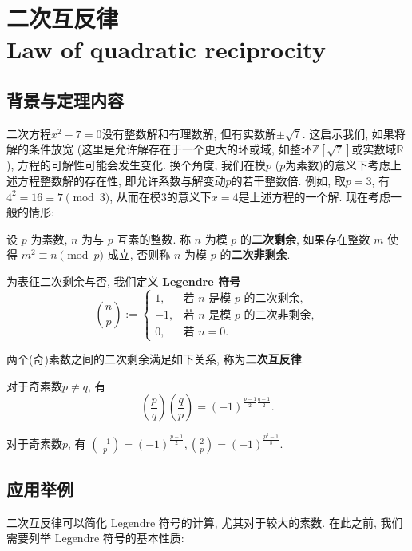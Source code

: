 \documentclass[main]{subfiles}
\newcommand{\mr}{\mathbb{R}}
\newcommand{\mz}{\mathbb{Z}}
\begin{document}
\renewcommand{\filename}{二次互反律}%
\section{二次互反律 \\ Law of quadratic reciprocity}

\subsection{背景与定理内容}

二次方程$x^2-7=0$没有整数解和有理数解, 但有实数解$\pm\sqrt{7}$. 这启示我们, 如果将解的条件放宽 (这里是允许解存在于一个更大的环或域, 如整环$\mz[\sqrt{7}]$或实数域$\mr$), 方程的可解性可能会发生变化. 换个角度, 我们在模$p$ ($p$为素数)的意义下考虑上述方程整数解的存在性, 即允许系数与解变动$p$的若干整数倍. 例如, 取$p=3$, 有$4^2 = 16 \equiv 7 \pmod 3$, 从而在模$3$的意义下$x=4$是上述方程的一个解. 现在考虑一般的情形:

\begin{definition}[二次剩余]
	设 $p$ 为素数, $n$ 为与 $p$ 互素的整数.
	称 $n$ 为模 $p$ 的\textbf{二次剩余},
	如果存在整数 $m$ 使得
	\(
	m^2 \equiv n \pmod p
	\)
	成立, 否则称 $n$ 为模 $p$ 的\textbf{二次非剩余}.
\end{definition}

为表征二次剩余与否, 我们定义 \textbf{Legendre 符号}
\[
	\left( \frac{n}{p} \right) := \left\{\begin{array}{ll}
		1,  & \mbox{若 $n$ 是模 $p$ 的二次剩余},  \\
		-1, & \mbox{若 $n$ 是模 $p$ 的二次非剩余}, \\
		0,  & \mbox{若 $n=0$}.
	\end{array}\right.
\]

两个(奇)素数之间的二次剩余满足如下关系, 称为\textbf{二次互反律}.

\begin{theorem}[二次互反律]
	对于奇素数$p \neq q$, 有
	\[\left( \frac{p}{q} \right) \left( \frac{q}{p} \right) = (-1)^{\frac{p-1}{2}\frac{q-1}{2}}.\]
\end{theorem}

\begin{theorem}[补充定理]
	对于奇素数$p$, 有 \(\left( \frac{-1}{p} \right) = (-1)^{\frac{p-1}{2}}, \left( \frac{2}{p} \right) = (-1)^{\frac{p^2-1}{8}}.\)
\end{theorem}

\subsection{应用举例}
二次互反律可以简化 Legendre 符号的计算, 尤其对于较大的素数. 在此之前, 我们需要列举 Legendre 符号的基本性质:
\end{document}
